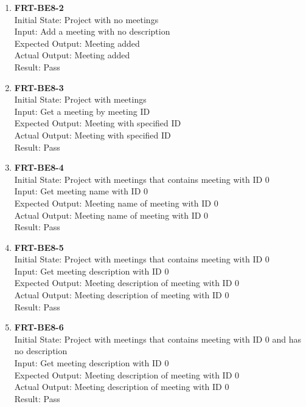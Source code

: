 \documentclass[12pt, titlepage]{article}
\begin{document}
\begin{enumerate}
    \item{\textbf{FRT-BE8-2}}\\
    Initial State: Project with no meetings\\
    Input: Add a meeting with no description\\
    Expected Output: Meeting added\\
    Actual Output: Meeting added\\
    Result: Pass
    
    \item{\textbf{FRT-BE8-3}}\\
    Initial State: Project with meetings\\
    Input: Get a meeting by meeting ID\\
    Expected Output: Meeting with specified ID\\
    Actual Output: Meeting with specified ID\\
    Result: Pass
    
    \item{\textbf{FRT-BE8-4}}\\
    Initial State: Project with meetings that contains meeting with ID 0\\
    Input: Get meeting name with ID 0\\
    Expected Output: Meeting name of meeting with ID 0\\
    Actual Output: Meeting name of meeting with ID 0\\
    Result: Pass
    
    \item{\textbf{FRT-BE8-5}}\\
    Initial State: Project with meetings that contains meeting with ID 0\\
    Input: Get meeting description with ID 0\\
    Expected Output: Meeting description of meeting with ID 0\\
    Actual Output: Meeting description of meeting with ID 0\\
    Result: Pass
    
    \item{\textbf{FRT-BE8-6}}\\
    Initial State: Project with meetings that contains meeting with ID 0 and has no description\\
    Input: Get meeting description with ID 0\\
    Expected Output: Meeting description of meeting with ID 0\\
    Actual Output: Meeting description of meeting with ID 0\\
    Result: Pass
    

\end{enumerate}
\end{document}
